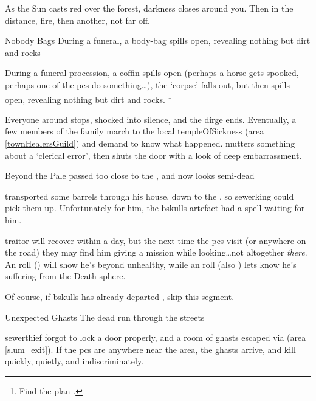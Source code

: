 \begin{boxtext}
  As the Sun casts red over the forest, darkness closes around you.
  Then in the distance, fire, then another, not far off.
\end{boxtext}

  {Nobody Bags}%
  {During a funeral, a body-bag spills open, revealing nothing but dirt and rocks}%
  \label{sewerPt2}

During a funeral procession, a coffin spills open (perhaps a horse gets spooked, perhaps one of the \glspl{pc} do something\ldots), the `corpse' falls out, but then spills open, revealing nothing but dirt and rocks.%
\footnote{Find the plan .}

Everyone around stops, shocked into silence, and the dirge ends.
Eventually, a few members of the family march to the local \gls{templeOfSickness} (area \vref{townHealersGuild}) and demand to know what happened.
 mutters something about a `clerical error', then shuts the door with a look of deep embarrassment.

  {Beyond the Pale}%
  { passed too close to the , and now looks semi-dead}%

\begin{exampletext}
   transported some barrels through his house, down to the , so \gls{sewerking} could pick them up.
  Unfortunately for him, the \gls{bskulls} \gls{artefact} had a spell waiting for him.
\end{exampletext}

\Gls{traitor} will recover within a day, but the next time the \glspl{pc} visit  (or anywhere on the road) they may find him giving a mission while looking\ldots not altogether \textit{there}.
An  roll (\tn[8]) will show he's beyond unhealthy, while an  roll (also \tn[8]) lets  know he's suffering from the Death \gls{sphere}.

Of course, if \gls{bskulls} has already departed , skip this \gls{segment}.

{Unexpected Ghasts}%
{The dead run through the streets}%

\Gls{sewerthief} forgot to lock a door properly, and a room of ghasts escaped via  (area \vref{slum_exit}).
If the \glspl{pc} are anywhere near the area, the ghasts arrive, and kill quickly, quietly, and indiscriminately.

